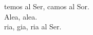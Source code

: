 \begin{cancion}%
	temos al Ser, camos al Sor.\\
	Alea, alea.\\
	ria, gia, ria al Ser.\\
\end{cancion}%
